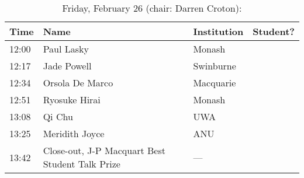 \documentclass[amsmath,onecolumn]{revtex4-1}
\begin{document}
\begin{table}[!htbp]
	\centering
	\caption{Friday, February 26 (chair: Darren Croton):}
\begin{tabular}{| l | l | l | c |}
	\hline
	Time & Name  & Institution & Student? \\ 		
	\hline
	12:00 & Paul	Lasky & Monash & \\
	12:17 & Jade	Powell & Swinburne & \\
	12:34 & Orsola	De Marco & Macquarie & \\
	12:51 & Ryosuke	Hirai  & Monash & \\
	13:08 & Qi	Chu & UWA & \\
	13:25 & Meridith	Joyce & ANU  & \\
	13:42 & Close-out, J-P Macquart Best Student Talk Prize & --- & \\
	\hline
\end{tabular}
\end{table}
\end{document}
